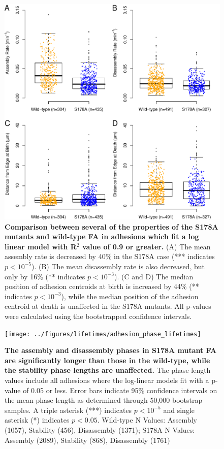 \begin{figure}[htbp]
\begin{center}
\includegraphics[width=\textwidth]{../figures/S178A/S178A_vs_wild-type}
\end{center}
\caption{
{\bf Comparison between several of the properties of the S178A mutants and wild-type FA in adhesions which fit a log linear model with R$^2$ value of 0.9 or greater.} (A) The mean assembly rate is decreased by 40\% in the S178A case (*** indicates $p<10^{-5}$). (B) The mean disassembly rate is also decreased, but only by 16\% (** indicates $p<10^{-3}$). (C and D) The median position of adhesion centroids at birth is increased by 44\% (** indicates $p<10^{-3}$), while the median position of the adhesion centroid at death is unaffected in the S178A mutants. All p-values were calculated using the bootstrapped confidence intervals. 
}
\label{S178A}
\end{figure}

\begin{figure}[htbp]
\begin{center}
\texttt{[image: ../figures/lifetimes/adhesion\_phase\_lifetimes]}
\end{center}
\caption{
{\bf The assembly and disassembly phases in S178A mutant FA are significantly longer than those in the wild-type, while the stability phase lengths are unaffected.} The phase length values include all adhesions where the log-linear models fit with a p-value of 0.05 or less.  Error bars indicate 95\% confidence intervals on the mean phase length as determined through 50,000 bootstrap samples. A triple asterisk (***) indicates $p<10^{-5}$ and single asterisk (*) indicates $p<0.05$. Wild-type N Values: Assembly (1057), Stability (456), Disassembly (1371); S178A N Values: Assembly (2089), Stability (868), Disassembly (1761)
}
\label{lifetimes}
\end{figure}